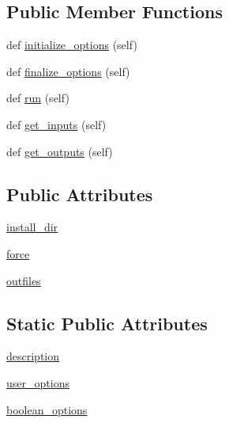 \subsection*{Public Member Functions}
\begin{DoxyCompactItemize}
\item 
def \hyperlink{classsetuptools_1_1__distutils_1_1command_1_1install__headers_1_1install__headers_a1fd677b63415d55c69a96f3fa0b6370d}{initialize\+\_\+options} (self)
\item 
def \hyperlink{classsetuptools_1_1__distutils_1_1command_1_1install__headers_1_1install__headers_a078a369fe4d6f17dfb39ce6cb4b7b15e}{finalize\+\_\+options} (self)
\item 
def \hyperlink{classsetuptools_1_1__distutils_1_1command_1_1install__headers_1_1install__headers_a64569e2a6cdf961fe34710e5dc7071fc}{run} (self)
\item 
def \hyperlink{classsetuptools_1_1__distutils_1_1command_1_1install__headers_1_1install__headers_a0523d29075569597b9b767b9eb1d8e72}{get\+\_\+inputs} (self)
\item 
def \hyperlink{classsetuptools_1_1__distutils_1_1command_1_1install__headers_1_1install__headers_aab7a046fd5a76c427c412eafa4ecb85b}{get\+\_\+outputs} (self)
\end{DoxyCompactItemize}
\subsection*{Public Attributes}
\begin{DoxyCompactItemize}
\item 
\hyperlink{classsetuptools_1_1__distutils_1_1command_1_1install__headers_1_1install__headers_a993eaa9d2310006afd2552e7c57fd242}{install\+\_\+dir}
\item 
\hyperlink{classsetuptools_1_1__distutils_1_1command_1_1install__headers_1_1install__headers_ad1c4bae9ac155723c28869bf41678b4e}{force}
\item 
\hyperlink{classsetuptools_1_1__distutils_1_1command_1_1install__headers_1_1install__headers_a573d06a743607fc827741640d23c567d}{outfiles}
\end{DoxyCompactItemize}
\subsection*{Static Public Attributes}
\begin{DoxyCompactItemize}
\item 
\hyperlink{classsetuptools_1_1__distutils_1_1command_1_1install__headers_1_1install__headers_ae87b0c399c809d128a84610e116532e7}{description}
\item 
\hyperlink{classsetuptools_1_1__distutils_1_1command_1_1install__headers_1_1install__headers_ae4695311c19d57b1b853b7b339e8ec1a}{user\+\_\+options}
\item 
\hyperlink{classsetuptools_1_1__distutils_1_1command_1_1install__headers_1_1install__headers_a99fcd1f3a50ad322916fa7c18b47bd8b}{boolean\+\_\+options}
\end{DoxyCompactItemize}


